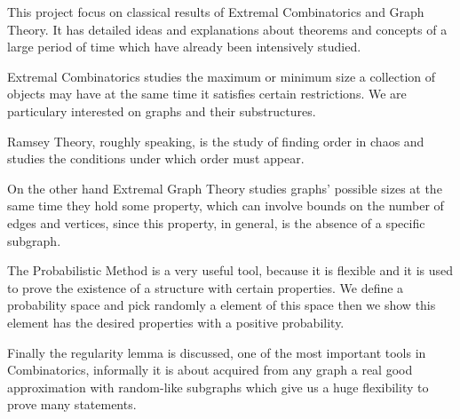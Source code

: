 \documentclass[12pt,twoside,a4paper]{book}
\numberwithin{equation}{section}
\theoremstyle{remark}
\begin{document}
This project focus on classical results of Extremal Combinatorics and Graph Theory. It has detailed ideas and explanations about theorems and concepts of a large period of time which have already been intensively studied.

Extremal Combinatorics studies the maximum or minimum size a collection of objects may have at the same time it satisfies certain restrictions. We are particulary interested on graphs and their substructures. 

Ramsey Theory, roughly speaking, is the study of finding order in chaos and studies the conditions under which order must appear.

On the other hand Extremal Graph Theory studies graphs' possible sizes at the same time they hold some property, which can involve bounds on the number of edges and vertices, since this property, in general, is the absence of a specific subgraph.

The Probabilistic Method is a very useful tool, because it is flexible and it is used to prove the existence of a structure with certain properties. We define a probability space and pick randomly a element of this space then we show this element has the desired properties with a positive probability.

Finally the regularity lemma is discussed, one of the most important tools in Combinatorics, informally it is about acquired from any graph a real good approximation with random-like subgraphs which give us a huge flexibility to prove many statements.






\end{document}
